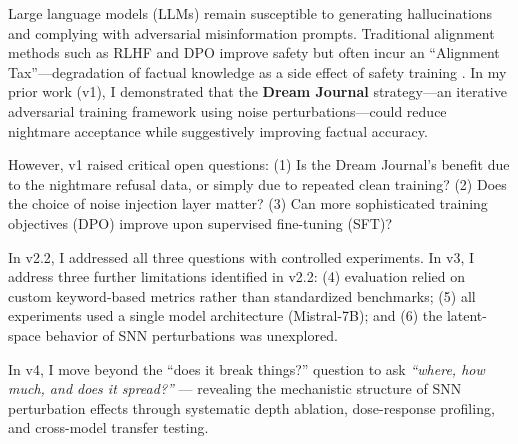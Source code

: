 \documentclass[11pt,a4paper]{article}
\begin{document}
Large language models (LLMs) remain susceptible to generating hallucinations and complying with adversarial misinformation prompts. Traditional alignment methods such as RLHF and DPO improve safety but often incur an ``Alignment Tax''---degradation of factual knowledge as a side effect of safety training \cite{ouyang2022training}. In my prior work (v1), I demonstrated that the \textbf{Dream Journal} strategy---an iterative adversarial training framework using noise perturbations---could reduce nightmare acceptance while suggestively improving factual accuracy.

However, v1 raised critical open questions: (1) Is the Dream Journal's benefit due to the nightmare refusal data, or simply due to repeated clean training? (2) Does the choice of noise injection layer matter? (3) Can more sophisticated training objectives (DPO) improve upon supervised fine-tuning (SFT)?

In v2.2, I addressed all three questions with controlled experiments. In v3, I address three further limitations identified in v2.2: (4) evaluation relied on custom keyword-based metrics rather than standardized benchmarks; (5) all experiments used a single model architecture (Mistral-7B); and (6) the latent-space behavior of SNN perturbations was unexplored.

In v4, I move beyond the ``does it break things?'' question to ask \emph{``where, how much, and does it spread?''} --- revealing the mechanistic structure of SNN perturbation effects through systematic depth ablation, dose-response profiling, and cross-model transfer testing.
\end{document}
